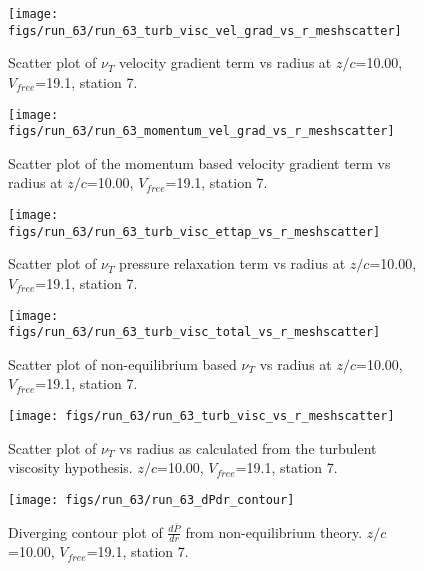 \begin{figure}[H]
\centering
\texttt{[image: figs/run\_63/run\_63\_turb\_visc\_vel\_grad\_vs\_r\_meshscatter]}
\caption{Scatter plot of $\nu_T$ velocity gradient term vs radius at $z/c$=10.00, $V_{free}$=19.1, station 7.}
\end{figure}


\begin{figure}[H]
\centering
\texttt{[image: figs/run\_63/run\_63\_momentum\_vel\_grad\_vs\_r\_meshscatter]}
\caption{Scatter plot of the momentum based velocity gradient term vs radius at $z/c$=10.00, $V_{free}$=19.1, station 7.}
\end{figure}


\begin{figure}[H]
\centering
\texttt{[image: figs/run\_63/run\_63\_turb\_visc\_ettap\_vs\_r\_meshscatter]}
\caption{Scatter plot of $\nu_T$ pressure relaxation term vs radius at $z/c$=10.00, $V_{free}$=19.1, station 7.}
\end{figure}


\begin{figure}[H]
\centering
\texttt{[image: figs/run\_63/run\_63\_turb\_visc\_total\_vs\_r\_meshscatter]}
\caption{Scatter plot of non-equilibrium based $\nu_T$ vs radius at $z/c$=10.00, $V_{free}$=19.1, station 7.}
\end{figure}


\begin{figure}[H]
\centering
\texttt{[image: figs/run\_63/run\_63\_turb\_visc\_vs\_r\_meshscatter]}
\caption{Scatter plot of $\nu_T$ vs radius as calculated from the turbulent viscosity hypothesis. $z/c$=10.00, $V_{free}$=19.1, station 7.}
\end{figure}


\begin{figure}[H]
\centering
\texttt{[image: figs/run\_63/run\_63\_dPdr\_contour]}
\caption{Diverging contour plot of $\frac{d\bar{P}}{dr}$ from non-equilibrium theory. $z/c$=10.00, $V_{free}$=19.1, station 7.}
\end{figure}


